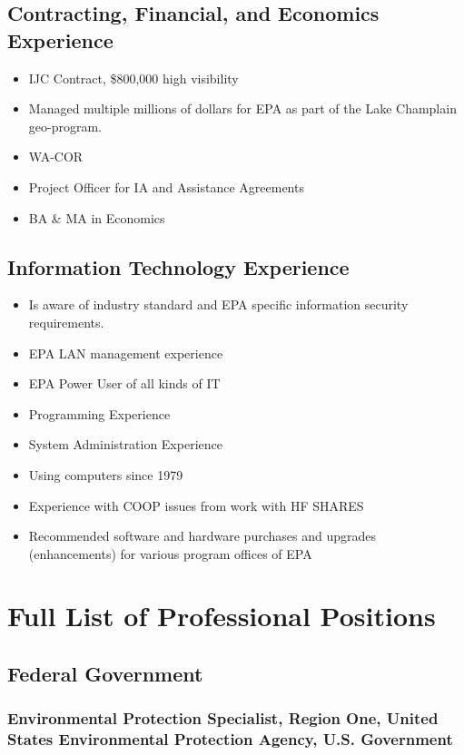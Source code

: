 \documentclass[12pt]{article}
\begin{document}
\subsection{Contracting, Financial, and Economics Experience}
\begin{itemize}
\item IJC Contract, \$800,000 high visibility
\item Managed multiple millions of dollars for EPA as part of the Lake Champlain geo-program.
\item WA-COR
\item Project Officer for IA and Assistance Agreements
\item BA \& MA in Economics
  
\end{itemize}

\subsection{Information Technology Experience}
\begin{itemize}
\item Is aware of industry standard and EPA specific information security requirements.
\item EPA LAN management experience
\item EPA Power User of all kinds of IT
\item Programming Experience
\item System Administration Experience
\item Using computers since 1979
\item Experience with COOP issues from work with HF SHARES
\item Recommended software and hardware purchases and upgrades (enhancements) for various program offices of EPA
   
\end{itemize}


\section{Full List of Professional Positions}

\subsection {Federal Government}
\subsubsection{Environmental Protection Specialist, Region One,
United States Environmental Protection Agency, U.S. Government}
\end{document}
